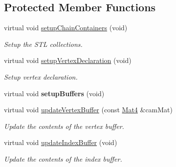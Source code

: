 \subsection*{Protected Member Functions}
\begin{DoxyCompactItemize}
\item 
\mbox{\label{classPUBillboardChain_ac01cf395b4534cd4e9fcd9d9ec59cfd3}} 
virtual void \hyperlink{classPUBillboardChain_ac01cf395b4534cd4e9fcd9d9ec59cfd3}{setup\+Chain\+Containers} (void)
\begin{DoxyCompactList}\small\item\em Setup the S\+TL collections. \end{DoxyCompactList}\item 
\mbox{\label{classPUBillboardChain_ac11ba69d8148fd8233aeaf256e27734c}} 
virtual void \hyperlink{classPUBillboardChain_ac11ba69d8148fd8233aeaf256e27734c}{setup\+Vertex\+Declaration} (void)
\begin{DoxyCompactList}\small\item\em Setup vertex declaration. \end{DoxyCompactList}\item 
\mbox{\label{classPUBillboardChain_ac645c3f65f22ab75dff584942d077404}} 
virtual void {\bfseries setup\+Buffers} (void)
\item 
\mbox{\label{classPUBillboardChain_a6960cf5401f98cbd0d0fdb122f39ca9e}} 
virtual void \hyperlink{classPUBillboardChain_a6960cf5401f98cbd0d0fdb122f39ca9e}{update\+Vertex\+Buffer} (const \hyperlink{classMat4}{Mat4} \&cam\+Mat)
\begin{DoxyCompactList}\small\item\em Update the contents of the vertex buffer. \end{DoxyCompactList}\item 
\mbox{\label{classPUBillboardChain_ae1ae3e3923344b57de52faf72718a4db}} 
virtual void \hyperlink{classPUBillboardChain_ae1ae3e3923344b57de52faf72718a4db}{update\+Index\+Buffer} (void)
\begin{DoxyCompactList}\small\item\em Update the contents of the index buffer. \end{DoxyCompactList}\item 

\end{DoxyCompactItemize}
